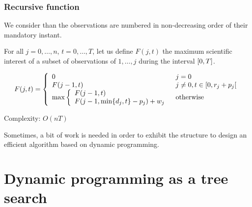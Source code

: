 \documentclass{beamer}
\begin{document}
\begin{frame}
  \frametitle{Recursive function}
  \small

  We consider than the observations are numbered in non-decreasing order of their mandatory instant.

  \bigskip

  \pause
  For all $j = 0, \dots, n$, $t = 0, \dots, T$, let us define \alert{$F(j, t)$} the maximum scientific interest of a subset of observations of $1, \dots, j$ during the interval $\interval[]{0}{T}$.

  \pause
  \begin{displaymath}
    F(j, t) = 
    \left\{
      \begin{array}{ll}
        0 & j = 0 \\
        F(j - 1, t) & j \neq 0, t \in \interval[open right]{0}{r_j + p_j} \\
          \max \left\{ 
            \begin{array}{l}
              F(j - 1, t)	 \\
              F(j - 1, \min\{d_j, t\} - p_j) + w_j
            \end{array}
            \right. & \text{otherwise} \\
      \end{array}
    \right.
  \end{displaymath}

  \pause
  Complexity: $O(nT)$

  \bigskip

  \pause
  Sometimes, a bit of work is needed in order to exhibit the structure to design an efficient algorithm based on dynamic programming.
\end{frame}

\section{Dynamic programming as a tree search}
\end{document}
